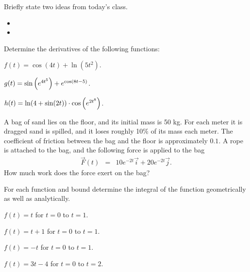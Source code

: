 \postClass

\begin{problem}
\item Briefly state two ideas from today's class.
  \begin{itemize}
  \item 
  \item 
  \end{itemize}
\item Determine the derivatives of the following functions:
  \begin{subproblem}
  \item $f(t) = \cos(4t) + \ln(5t^2)$.
    \vfill
  \item $g(t) = \sin\left( e^{4t^5} \right)  + e^{\cos\left( 8t-5 \right)}$.
    \vfill
  \item $h(t) = \ln(4+\sin(2t) ) \cdot \cos \left( e^{2t^8} \right)$.
    \vfill
  \end{subproblem}

  \clearpage

\item A bag of sand lies on the floor, and its initial mass is 50
  kg. For each meter it is dragged sand is spilled, and it loses
  roughly 10\% of its mass each meter. The coefficient of friction
  between the bag and the floor is approximately $0.1$. A rope is
  attached to the bag, and the following force is applied to the bag
  \begin{eqnarray*}
    \vec{F}(t) & = & 10e^{-2t} \vec{i} + 20 e^{-2t} \vec{j}.
  \end{eqnarray*}
  How much work does the force exert on the bag?

  \vfill


\end{problem}


\begin{problem}
\item For each function and bound determine the integral of the
  function geometrically as well as analytically. 
  \begin{subproblem}
  \item $f(t)=t$ for $t=0$ to $t=1$.
    \vfill
  \item $f(t)=t+1$ for $t=0$ to $t=1$.
    \vfill
  \item $f(t)=-t$ for $t=0$ to $t=1$.
    \vfill
  \item $f(t)=3t-4$ for $t=0$ to $t=2$.
    \vfill
  \end{subproblem}
\end{problem}


